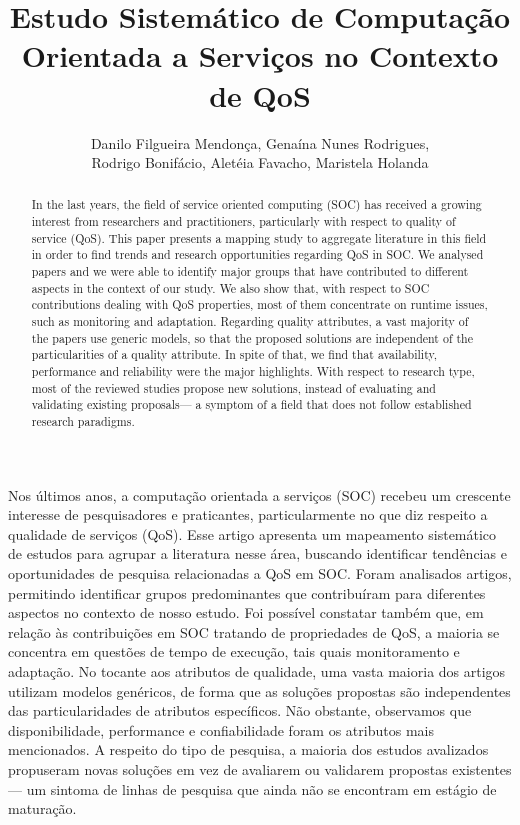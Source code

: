 \documentclass[12pt]{article}
\title{Estudo Sistem\'{a}tico de Computa\c{c}\~{a}o Orientada a Servi\c{c}os no Contexto de QoS}
\author{Danilo Filgueira Mendon\c{c}a\inst{1}, Gena\'{i}na Nunes Rodrigues\inst{1}, \\ Rodrigo Bonif\'{a}cio\inst{1}, Alet\'{e}ia Favacho\inst{1}, Maristela Holanda\inst{1} }
\begin{document}
 



\maketitle

\begin{abstract}

In the last years, the field of service oriented computing (SOC) has received a growing interest from researchers and practitioners, particularly with respect to quality of service (QoS). This paper presents a mapping study to aggregate literature in this field in order to find trends and research opportunities regarding QoS in SOC. We analysed \AcceptedPubs papers and we were able to identify major groups that have contributed to different aspects in the context of our study. We also show that, with respect to SOC contributions dealing with QoS properties, most of them concentrate on runtime issues, such as monitoring and adaptation. Regarding quality attributes, a vast majority of the papers use generic models, so that the proposed solutions are independent of the particularities of a quality attribute. In spite of that, we find that availability, performance and reliability were the major highlights. With respect to research type, most of the reviewed studies propose new solutions, instead of evaluating and validating existing proposals--- a symptom of a field that does not follow established research paradigms.
\end{abstract}

\begin{resumo}
Nos últimos anos, a computação orientada a serviços (SOC) recebeu um crescente interesse de pesquisadores e praticantes, particularmente no que diz respeito a qualidade de serviços (QoS). Esse artigo apresenta um mapeamento sistem\'{a}tico de estudos para agrupar a literatura nesse \'{a}rea, buscando  identificar tendências e oportunidades de pesquisa relacionadas a QoS em SOC. Foram analisados \AcceptedPubs artigos, permitindo identificar grupos predominantes que contribuíram para diferentes aspectos no contexto de nosso estudo. Foi poss\'{i}vel constatar tamb\'{e}m que, em relação às contribuições em SOC tratando de propriedades de QoS, a maioria se concentra em questões de tempo de execução, tais quais monitoramento e adaptação. No tocante aos atributos de qualidade, uma vasta maioria dos artigos utilizam modelos genéricos, de forma que as soluções propostas são independentes das particularidades de atributos 
espec\'{i}ficos. Não obstante, observamos que disponibilidade, performance e confiabilidade foram os atributos mais mencionados. A respeito do tipo de pesquisa, a maioria dos estudos avalizados propuseram novas soluções em vez de avaliarem ou validarem propostas existentes--- um sintoma 
de linhas de pesquisa que ainda n\~{a}o se encontram em est\'{a}gio de matura\c c\~{a}o.
  
\end{resumo}



    











\end{document}
